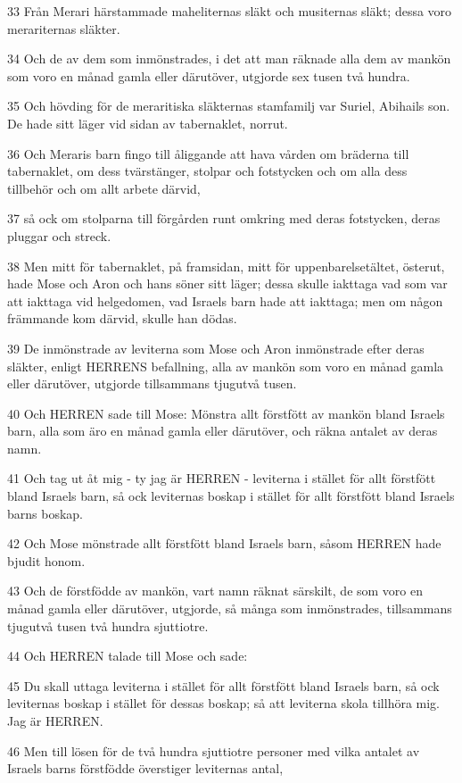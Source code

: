 \par 33 Från Merari härstammade maheliternas släkt och musiternas släkt; dessa voro merariternas släkter.
\par 34 Och de av dem som inmönstrades, i det att man räknade alla dem av mankön som voro en månad gamla eller därutöver, utgjorde sex tusen två hundra.
\par 35 Och hövding för de meraritiska släkternas stamfamilj var Suriel, Abihails son. De hade sitt läger vid sidan av tabernaklet, norrut.
\par 36 Och Meraris barn fingo till åliggande att hava vården om bräderna till tabernaklet, om dess tvärstänger, stolpar och fotstycken och om alla dess tillbehör och om allt arbete därvid,
\par 37 så ock om stolparna till förgården runt omkring med deras fotstycken, deras pluggar och streck.
\par 38 Men mitt för tabernaklet, på framsidan, mitt för uppenbarelsetältet, österut, hade Mose och Aron och hans söner sitt läger; dessa skulle iakttaga vad som var att iakttaga vid helgedomen, vad Israels barn hade att iakttaga; men om någon främmande kom därvid, skulle han dödas.
\par 39 De inmönstrade av leviterna som Mose och Aron inmönstrade efter deras släkter, enligt HERRENS befallning, alla av mankön som voro en månad gamla eller därutöver, utgjorde tillsammans tjugutvå tusen.
\par 40 Och HERREN sade till Mose: Mönstra allt förstfött av mankön bland Israels barn, alla som äro en månad gamla eller därutöver, och räkna antalet av deras namn.
\par 41 Och tag ut åt mig - ty jag är HERREN - leviterna i stället för allt förstfött bland Israels barn, så ock leviternas boskap i stället för allt förstfött bland Israels barns boskap.
\par 42 Och Mose mönstrade allt förstfött bland Israels barn, såsom HERREN hade bjudit honom.
\par 43 Och de förstfödde av mankön, vart namn räknat särskilt, de som voro en månad gamla eller därutöver, utgjorde, så många som inmönstrades, tillsammans tjugutvå tusen två hundra sjuttiotre.
\par 44 Och HERREN talade till Mose och sade:
\par 45 Du skall uttaga leviterna i stället för allt förstfött bland Israels barn, så ock leviternas boskap i stället för dessas boskap; så att leviterna skola tillhöra mig. Jag är HERREN.
\par 46 Men till lösen för de två hundra sjuttiotre personer med vilka antalet av Israels barns förstfödde överstiger leviternas antal,
